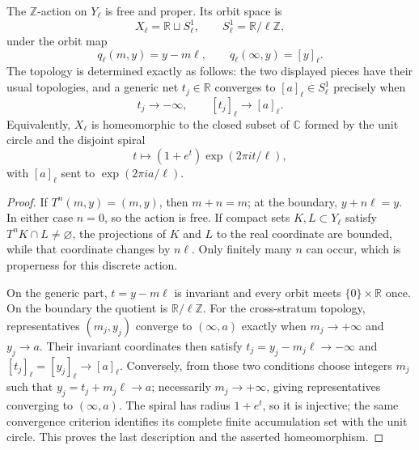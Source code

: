 \begin{proposition}
\label{prop:primitive-local-orbit-space}
The $\mathbb Z$-action on $Y_\ell$ is free and proper.  Its orbit space is
\[
 X_\ell=\mathbb R\sqcup S^1_\ell,
 \qquad S^1_\ell=\mathbb R/\ell\mathbb Z,
\]
under the orbit map
\[
 q_\ell(m,y)=y-m\ell,\qquad
 q_\ell(\infty,y)=[y]_\ell.
\]
The topology is determined exactly as follows: the two displayed pieces have
their usual topologies, and a generic net $t_j\in\mathbb R$ converges to
$[a]_\ell\in S^1_\ell$ precisely when
\[
 t_j\longrightarrow-\infty,\qquad [t_j]_\ell\longrightarrow[a]_\ell.
\]
Equivalently, $X_\ell$ is homeomorphic to the closed subset of $\mathbb C$
formed by the unit circle and the disjoint spiral
\[
 t\longmapsto (1+e^t)\exp(2\pi i t/\ell),
\]
with $[a]_\ell$ sent to $\exp(2\pi i a/\ell)$.
\end{proposition}

\begin{proof}
If $T^n(m,y)=(m,y)$, then $m+n=m$; at the boundary,
$y+n\ell=y$.  In either case $n=0$, so the action is free.  If compact sets
$K,L\subset Y_\ell$ satisfy $T^nK\cap L\ne\varnothing$, the projections of
$K$ and $L$ to the real coordinate are bounded, while that coordinate changes
by $n\ell$.  Only finitely many $n$ can occur, which is properness for this
discrete action.

On the generic part, $t=y-m\ell$ is invariant and every orbit meets
$\{0\}\times\mathbb R$ once.  On the boundary the quotient is
$\mathbb R/\ell\mathbb Z$.  For the cross-stratum topology, representatives
$(m_j,y_j)$ converge to $(\infty,a)$ exactly when $m_j\to+\infty$ and
$y_j\to a$.  Their invariant coordinates then satisfy
$t_j=y_j-m_j\ell\to-\infty$ and $[t_j]_\ell=[y_j]_\ell\to[a]_\ell$.
Conversely, from those two conditions choose integers $m_j$ such that
$y_j=t_j+m_j\ell\to a$; necessarily $m_j\to+\infty$, giving representatives
converging to $(\infty,a)$.  The spiral has radius $1+e^t$, so it is injective;
the same convergence criterion identifies its complete finite accumulation
set with the unit circle.  This proves the last description and the asserted
homeomorphism.
\end{proof}

